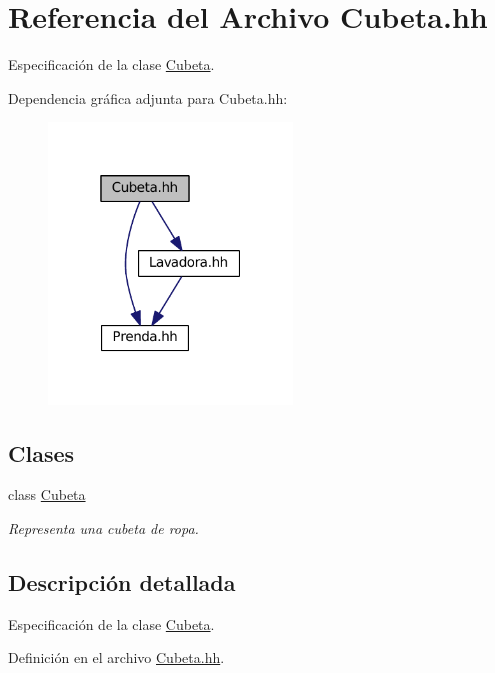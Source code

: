 \hypertarget{_cubeta_8hh}{\section{Referencia del Archivo Cubeta.\+hh}
\label{_cubeta_8hh}
}


Especificación de la clase \hyperlink{class_cubeta}{Cubeta}.  


Dependencia gráfica adjunta para Cubeta.\+hh\+:\nopagebreak
\begin{figure}[H]
\begin{center}
\leavevmode
\includegraphics[width=184pt]{_cubeta_8hh__incl}
\end{center}
\end{figure}
\subsection*{Clases}
\begin{DoxyCompactItemize}
\item 
class \hyperlink{class_cubeta}{Cubeta}
\begin{DoxyCompactList}\small\item\em Representa una cubeta de ropa. \end{DoxyCompactList}\end{DoxyCompactItemize}


\subsection{Descripción detallada}
Especificación de la clase \hyperlink{class_cubeta}{Cubeta}. 



Definición en el archivo \hyperlink{_cubeta_8hh_source}{Cubeta.\+hh}.

